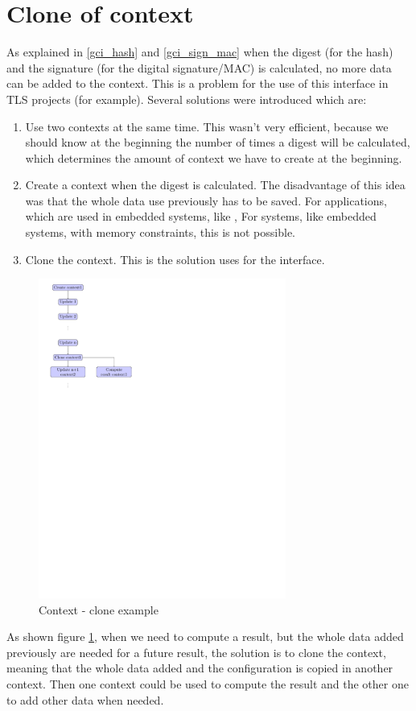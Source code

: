 \section{Clone of context}
\label{gci_cl_ctx}
As explained in \ref{gci_hash} and \ref{gci_sign_mac} when the digest (for the hash)
and the signature (for the digital signature/MAC) is calculated, no more data
can be added to the context.
This is a problem for the use of this interface in TLS projects (\embtls for
example).
Several solutions were introduced which are:
\begin{enumerate}
  \item Use two contexts at the same time.\newline
  This wasn't very efficient, because we should know at the beginning the
  number of times a digest will be calculated, which determines the amount of
  context we have to create at the beginning.
  \item Create a context when the digest is calculated.\newline
  The disadvantage of this idea was that the whole data use previously has to be
  saved. For applications, which are used in embedded systems, like \embtls, For
  systems, like embedded systems, with memory constraints, this is not possible.
  \item Clone the context. This is the solution uses for the interface.\newline
\end{enumerate}
\begin{figure}[!ht]
\centering
\includegraphics[trim=0cm 18.5cm 12cm 0cm,
height=10.5cm]{figures/hash_signature_clone.pdf}
\caption{Context - clone example}
\label{fig:gci_clone}
\end{figure}
As shown figure \ref{fig:gci_clone}, when we need to compute a result, but the
whole data added previously are needed for a future result, the solution is to
clone the context, meaning that the whole data added and the configuration is copied in another context.\newline
Then one context could be used to compute the result and the other one
to add other data when needed.\newline


